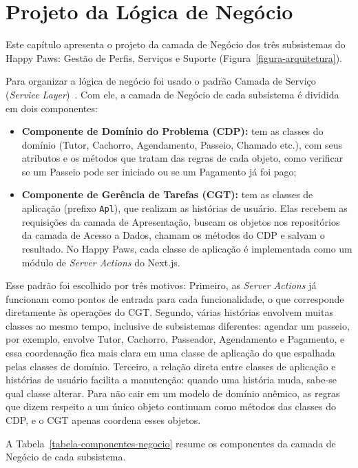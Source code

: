 
\chapter{Projeto da Lógica de Negócio}
\label{sec-logica-negocio}
\vspace{-1cm}

Este capítulo apresenta o projeto da camada de Negócio dos três subsistemas do Happy Paws: Gestão de Perfis, Serviços e Suporte (Figura~\ref{figura-arquitetura}).

Para organizar a lógica de negócio foi usado o padrão Camada de Serviço (\textit{Service Layer})~\cite{fowler:book02}. Com ele, a camada de Negócio de cada subsistema é dividida em dois componentes:

\begin{itemize}
	\item \textbf{Componente de Domínio do Problema (CDP):} tem as classes do domínio (Tutor, Cachorro, Agendamento, Passeio, Chamado etc.), com seus atributos e os métodos que tratam das regras de cada objeto, como verificar se um Passeio pode ser iniciado ou se um Pagamento já foi pago;
	\item \textbf{Componente de Gerência de Tarefas (CGT):} tem as classes de aplicação (prefixo \texttt{Apl}), que realizam as histórias de usuário. Elas recebem as requisições da camada de Apresentação, buscam os objetos nos repositórios da camada de Acesso a Dados, chamam os métodos do CDP e salvam o resultado. No Happy Paws, cada classe de aplicação é implementada como um módulo de \emph{Server Actions} do Next.js.
\end{itemize}

Esse padrão foi escolhido por três motivos: Primeiro, as \emph{Server Actions} já funcionam como pontos de entrada para cada funcionalidade, o que corresponde diretamente às operações do CGT. Segundo, várias histórias envolvem muitas classes ao mesmo tempo, inclusive de subsistemas diferentes: agendar um passeio, por exemplo, envolve Tutor, Cachorro, Passeador, Agendamento e Pagamento, e essa coordenação fica mais clara em uma classe de aplicação do que espalhada pelas classes de domínio. Terceiro, a relação direta entre classes de aplicação e histórias de usuário facilita a manutenção: quando uma história muda, sabe-se qual classe alterar. Para não cair em um modelo de domínio anêmico, as regras que dizem respeito a um único objeto continuam como métodos das classes do CDP, e o CGT apenas coordena esses objetos.

A Tabela~\ref{tabela-componentes-negocio} resume os componentes da camada de Negócio de cada subsistema.

